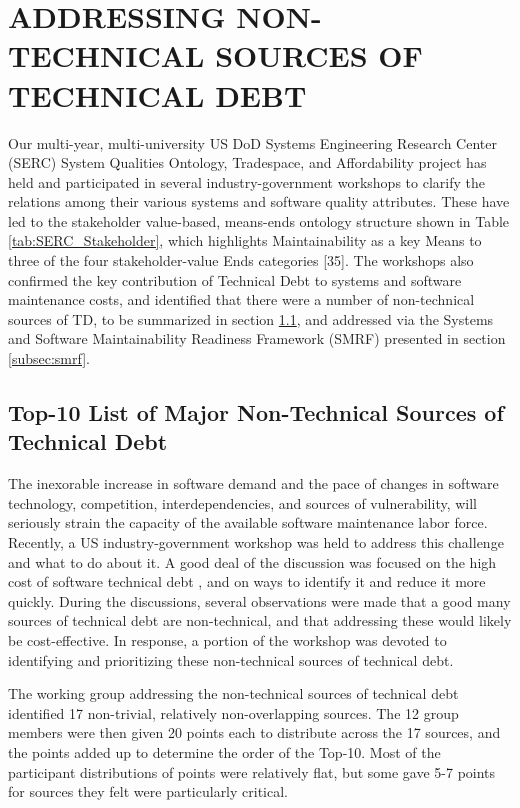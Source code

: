 \section{ADDRESSING NON-TECHNICAL SOURCES OF TECHNICAL DEBT}
\label{sec:smrf}

Our multi-year, multi-university US DoD Systems Engineering Research Center (SERC) System Qualities Ontology, Tradespace, and Affordability project has held and participated in several industry-government workshops to clarify the relations among their various systems and software quality attributes.  These have led to the stakeholder value-based, means-ends ontology structure shown in Table \ref{tab:SERC_Stakeholder}, which highlights Maintainability as a key Means to three of the four stakeholder-value Ends categories [35].
The workshops also confirmed the key contribution of Technical Debt to systems and software maintenance costs, and identified that there were a number of non-technical sources of TD, to be summarized in section \ref{subsec:topten}, and addressed via the Systems and Software Maintainability Readiness Framework (SMRF) presented in section \ref{subsec:smrf}.


\subsection{Top-10 List of Major Non-Technical Sources of Technical Debt}
\label{subsec:topten}

The inexorable increase in software demand and the pace of changes in software technology, competition, interdependencies, and sources of vulnerability, will seriously strain the capacity of the available software maintenance labor force.
Recently, a US industry-government workshop was held to address this challenge and what to do about it.
A good deal of the discussion was focused on the high cost of software technical debt \cite{6336722}, and on ways to identify it and reduce it more quickly.
During the discussions, several observations were made that a good many sources of technical debt are non-technical, and that addressing these would likely be cost-effective.
In response, a portion of the workshop was devoted to identifying and prioritizing these non-technical sources of technical debt.

The working group addressing the non-technical sources of technical debt identified 17 non-trivial, relatively non-overlapping sources.
The 12 group members were then given 20 points each to distribute across the 17 sources, and the points added up to determine the order of the Top-10.
Most of the participant distributions of points were relatively flat, but some gave 5-7 points for sources they felt were particularly critical.

